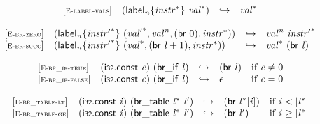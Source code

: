 \vspace{1ex}

$$
\begin{array}{@{}l@{}lcl@{}l@{}}
{[\textsc{\scriptsize E{-}label{-}vals}]} \quad & ({{\mathsf{label}}_{{\mathit{n}}}}{\{{{\mathit{instr}}^\ast}\}}~{{\mathit{val}}^\ast}) &\hookrightarrow& {{\mathit{val}}^\ast} &  \\
\end{array}
$$

\vspace{1ex}

$$
\begin{array}{@{}l@{}lcl@{}l@{}}
{[\textsc{\scriptsize E{-}br{-}zero}]} \quad & ({{\mathsf{label}}_{{\mathit{n}}}}{\{{{\mathit{instr}'}^\ast}\}}~({{\mathit{val}'}^\ast}, {{\mathit{val}}^{{\mathit{n}}}}, (\mathsf{br}~0), {{\mathit{instr}}^\ast})) &\hookrightarrow& {{\mathit{val}}^{{\mathit{n}}}}~{{\mathit{instr}'}^\ast} &  \\
{[\textsc{\scriptsize E{-}br{-}succ}]} \quad & ({{\mathsf{label}}_{{\mathit{n}}}}{\{{{\mathit{instr}'}^\ast}\}}~({{\mathit{val}}^\ast}, (\mathsf{br}~{\mathit{l}} + 1), {{\mathit{instr}}^\ast})) &\hookrightarrow& {{\mathit{val}}^\ast}~(\mathsf{br}~{\mathit{l}}) &  \\
\end{array}
$$

\vspace{1ex}

$$
\begin{array}{@{}l@{}lcl@{}l@{}}
{[\textsc{\scriptsize E{-}br\_if{-}true}]} \quad & (\mathsf{i{\scriptstyle32}}.\mathsf{const}~{\mathit{c}})~(\mathsf{br\_if}~{\mathit{l}}) &\hookrightarrow& (\mathsf{br}~{\mathit{l}}) &\quad
  \mbox{if}~{\mathit{c}} \neq 0 \\
{[\textsc{\scriptsize E{-}br\_if{-}false}]} \quad & (\mathsf{i{\scriptstyle32}}.\mathsf{const}~{\mathit{c}})~(\mathsf{br\_if}~{\mathit{l}}) &\hookrightarrow& \epsilon &\quad
  \mbox{if}~{\mathit{c}} = 0 \\
\end{array}
$$

\vspace{1ex}

$$
\begin{array}{@{}l@{}lcl@{}l@{}}
{[\textsc{\scriptsize E{-}br\_table{-}lt}]} \quad & (\mathsf{i{\scriptstyle32}}.\mathsf{const}~{\mathit{i}})~(\mathsf{br\_table}~{{\mathit{l}}^\ast}~{\mathit{l}'}) &\hookrightarrow& (\mathsf{br}~{{\mathit{l}}^\ast}[{\mathit{i}}]) &\quad
  \mbox{if}~{\mathit{i}} < {|{{\mathit{l}}^\ast}|} \\
{[\textsc{\scriptsize E{-}br\_table{-}ge}]} \quad & (\mathsf{i{\scriptstyle32}}.\mathsf{const}~{\mathit{i}})~(\mathsf{br\_table}~{{\mathit{l}}^\ast}~{\mathit{l}'}) &\hookrightarrow& (\mathsf{br}~{\mathit{l}'}) &\quad
  \mbox{if}~{\mathit{i}} \geq {|{{\mathit{l}}^\ast}|} \\
\end{array}
$$


